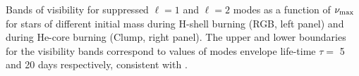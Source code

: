 \label{fig:visibility} Bands of visibility for suppressed $\ell=1$ and $\ell=2$ modes as a function of $\nu_{\rm max}$ for stars of different initial mass during H-shell burning (RGB, left panel) and during He-core burning (Clump, right panel). The upper and lower boundaries for the visibility bands correspond to values of modes envelope life-time $\tau=$ 5 and 20 days respectively, consistent with \cite{Dupret_2009,Corsaro_2015}.

  
  
  